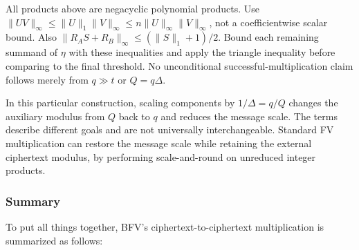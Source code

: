  All products above are negacyclic polynomial products. Use $\|UV\|_\infty\leq\|U\|_1\|V\|_\infty\leq n\|U\|_\infty\|V\|_\infty$, not a coefficientwise scalar bound. Also $\|R_AS+R_B\|_\infty\leq(\|S\|_1+1)/2$. Bound each remaining summand of $\eta$ with these inequalities and apply the triangle inequality before comparing to the final threshold. No unconditional successful-multiplication claim follows merely from $q\gg t$ or $Q=q\Delta$.

 In this particular construction, scaling components by $1/\Delta=q/Q$ changes the auxiliary modulus from $Q$ back to $q$ and reduces the message scale. The terms describe different goals and are not universally interchangeable. Standard FV multiplication can restore the message scale while retaining the external ciphertext modulus, by performing scale-and-round on unreduced integer products.

\subsubsection{Summary}
\label{subsubsec:bfv-mult-cipher-summary}

To put all things together, BFV's ciphertext-to-ciphertext multiplication is summarized as follows:

